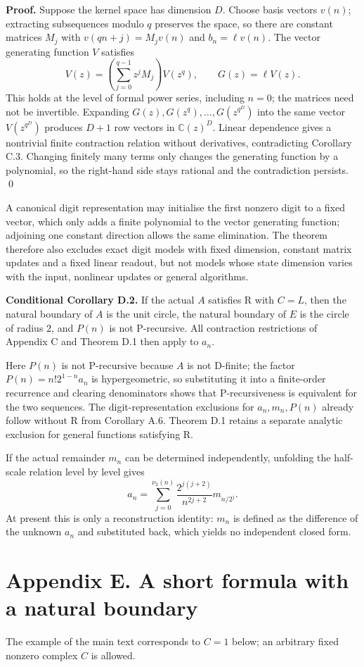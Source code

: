 \documentclass[11pt]{article}
\begin{document}
\textbf{Proof.} Suppose the kernel space has dimension $D$. Choose basis vectors $v(n)$; extracting subsequences modulo $q$ preserves the space, so there are constant matrices $M_j$ with $v(qn+j)=M_jv(n)$ and $b_n=\ell v(n)$. The vector generating function $V$ satisfies
\[
V(z)=\left(\sum_{j=0}^{q-1}z^jM_j\right)V(z^q),\qquad G(z)=\ell V(z).
\]
This holds at the level of formal power series, including $n=0$; the matrices need not be invertible. Expanding $G(z),G(z^q),\ldots,G(z^{q^D})$ into the same vector $V(z^{q^D})$ produces $D+1$ row vectors in $\mathbb C(z)^D$. Linear dependence gives a nontrivial finite contraction relation without derivatives, contradicting Corollary C.3. Changing finitely many terms only changes the generating function by a polynomial, so the right-hand side stays rational and the contradiction persists. \qed

A canonical digit representation may initialise the first nonzero digit to a fixed vector, which only adds a finite polynomial to the vector generating function; adjoining one constant direction allows the same elimination. The theorem therefore also excludes exact digit models with fixed dimension, constant matrix updates and a fixed linear readout, but not models whose state dimension varies with the input, nonlinear updates or general algorithms.

\textbf{Conditional Corollary D.2.} If the actual $A$ satisfies R with $C=L$, then the natural boundary of $A$ is the unit circle, the natural boundary of $E$ is the circle of radius $2$, and $P(n)$ is not P-recursive. All contraction restrictions of Appendix C and Theorem D.1 then apply to $a_n$.

Here $P(n)$ is not P-recursive because $A$ is not D-finite; the factor $P(n)=n!2^{1-n}a_n$ is hypergeometric, so substituting it into a finite-order recurrence and clearing denominators shows that P-recursiveness is equivalent for the two sequences. The digit-representation exclusions for $a_n,m_n,P(n)$ already follow without R from Corollary A.6. Theorem D.1 retains a separate analytic exclusion for general functions satisfying R.

If the actual remainder $m_n$ can be determined independently, unfolding the half-scale relation level by level gives
\[
a_n=\sum_{j=0}^{\nu_2(n)}\frac{2^{j(j+2)}}{n^{2j+2}}m_{n/2^j}.
\]
At present this is only a reconstruction identity: $m_n$ is defined as the difference of the unknown $a_n$ and substituted back, which yields no independent closed form.

\section*{Appendix E. A short formula with a natural boundary}
The example of the main text corresponds to $C=1$ below; an arbitrary fixed nonzero complex $C$ is allowed.
\end{document}
